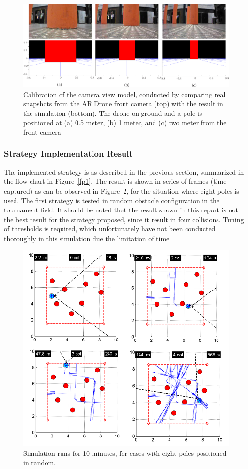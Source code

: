 \begin{figure}
\includegraphics[width=1\linewidth]{Figures/Calibrations.png}
\centering
\caption{Calibration of the camera view model, conducted by comparing real snapshots from the AR.Drone front camera (top) with the result in the simulation (bottom). The drone on ground and a pole is positioned at (a) 0.5 meter, (b) 1 meter, and (c) two meter from the front camera.}
\label{f:Calibrations}
\end{figure} 



\subsubsection{Strategy Implementation Result}
The implemented strategy is as described in the previous section, summarized in the flow chart in Figure~\ref{fp1}. The result is shown in series of frames (time-captured) as can be observed in Figure~\ref{f:Simulation_8Poles}, for the situation where eight poles is used. The first strategy is tested in random obstacle configuration in the tournament field. It should be noted that the result shown in this report is not the best result for the strategy proposed, since it result in four collisions. Tuning of thresholds is required, which unfortunately have not been conducted thoroughly in this simulation due the limitation of time.

\begin{figure}[h]
\includegraphics[width=1\linewidth]{Figures/Simulation_8Poles.png}
\centering
\caption{Simulation runs for 10 minutes, for cases with eight poles positioned in random.}
\label{f:Simulation_8Poles}
\end{figure}


